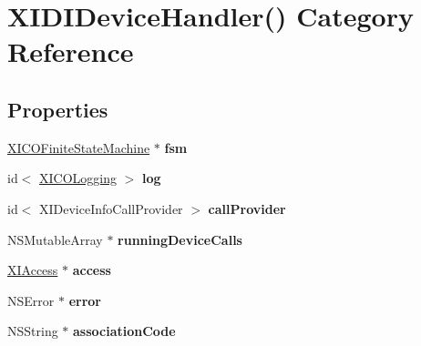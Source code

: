 \hypertarget{category_x_i_d_i_device_handler_07_08}{}\section{X\+I\+D\+I\+Device\+Handler() Category Reference}
\label{category_x_i_d_i_device_handler_07_08}
\subsection*{Properties}
\begin{DoxyCompactItemize}
\item 
\hypertarget{category_x_i_d_i_device_handler_07_08_a210361113eb9a28c44fa791b184bf949}{}\label{category_x_i_d_i_device_handler_07_08_a210361113eb9a28c44fa791b184bf949} 
\hyperlink{class_x_i_c_o_finite_state_machine}{X\+I\+C\+O\+Finite\+State\+Machine} $\ast$ {\bfseries fsm}
\item 
\hypertarget{category_x_i_d_i_device_handler_07_08_ad8372ce2d0a5cff3092e1e2d3cf492fd}{}\label{category_x_i_d_i_device_handler_07_08_ad8372ce2d0a5cff3092e1e2d3cf492fd} 
id$<$ \hyperlink{protocol_x_i_c_o_logging-p}{X\+I\+C\+O\+Logging} $>$ {\bfseries log}
\item 
\hypertarget{category_x_i_d_i_device_handler_07_08_a73b9e29fd0aae78b1ef8068826a3d771}{}\label{category_x_i_d_i_device_handler_07_08_a73b9e29fd0aae78b1ef8068826a3d771} 
id$<$ X\+I\+Device\+Info\+Call\+Provider $>$ {\bfseries call\+Provider}
\item 
\hypertarget{category_x_i_d_i_device_handler_07_08_a50ed36b4bad088162b876ab3dbb093a8}{}\label{category_x_i_d_i_device_handler_07_08_a50ed36b4bad088162b876ab3dbb093a8} 
N\+S\+Mutable\+Array $\ast$ {\bfseries running\+Device\+Calls}
\item 
\hypertarget{category_x_i_d_i_device_handler_07_08_aed1de29383ccf40c9957e30aae19c48e}{}\label{category_x_i_d_i_device_handler_07_08_aed1de29383ccf40c9957e30aae19c48e} 
\hyperlink{class_x_i_access}{X\+I\+Access} $\ast$ {\bfseries access}
\item 
\hypertarget{category_x_i_d_i_device_handler_07_08_a5f0518897425b6fce59b74ee34df69d8}{}\label{category_x_i_d_i_device_handler_07_08_a5f0518897425b6fce59b74ee34df69d8} 
N\+S\+Error $\ast$ {\bfseries error}
\item 
\hypertarget{category_x_i_d_i_device_handler_07_08_a36cac5d09f898c9590a70e29bb2b7d90}{}\label{category_x_i_d_i_device_handler_07_08_a36cac5d09f898c9590a70e29bb2b7d90} 
N\+S\+String $\ast$ {\bfseries association\+Code}

\end{DoxyCompactItemize}
